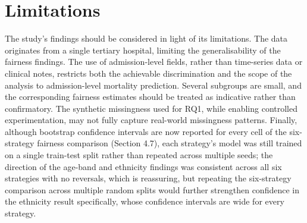 \documentclass[12pt,a4paper]{report}
\begin{document}
\section{Limitations}
The study's findings should be considered in light of its limitations. The data originates from a single tertiary hospital, limiting the generalisability of the fairness findings. The use of admission-level fields, rather than time-series data or clinical notes, restricts both the achievable discrimination and the scope of the analysis to admission-level mortality prediction. Several subgroups are small, and the corresponding fairness estimates should be treated as indicative rather than confirmatory. The synthetic missingness used for RQ1, while enabling controlled experimentation, may not fully capture real-world missingness patterns. Finally, although bootstrap confidence intervals are now reported for every cell of the six-strategy fairness comparison (Section 4.7), each strategy's model was still trained on a single train-test split rather than repeated across multiple seeds; the direction of the age-band and ethnicity findings was consistent across all six strategies with no reversals, which is reassuring, but repeating the six-strategy comparison across multiple random splits would further strengthen confidence in the ethnicity result specifically, whose confidence intervals are wide for every strategy.
\end{document}
